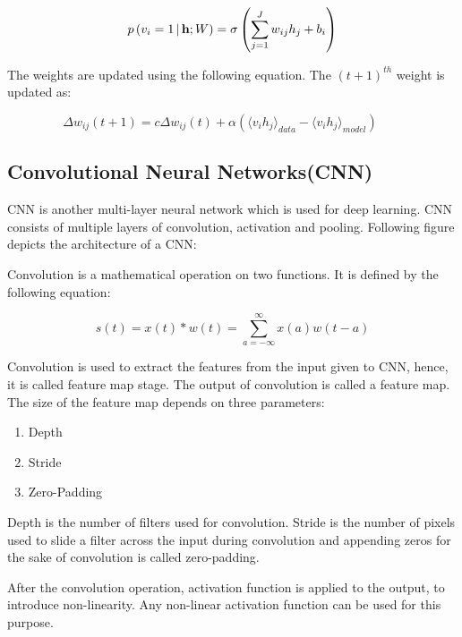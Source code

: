 \documentclass[sigconf]{acmart}
\begin{document}
\begin{equation} p\left ( {v_{i}=1}\thinspace \vert \thinspace {\mathbf {h};W}\right ) =\sigma \left ( \sum \limits _{j=1}^J {w_{ij}h_{j}+b_{i}} \right )\end{equation}

The weights are updated using the following equation. The $(t+1)^{th}$ weight is updated as:

\begin{equation} \Delta w_{ij}\left ( t+1 \right )=c\Delta w_{ij}\left ( t \right )+\alpha \left (\langle v_i h_j \rangle _{data}-\langle v_i h_j \rangle _{model} \right )\qquad\end{equation}

\subsection{Convolutional Neural Networks(CNN)}
CNN is another multi-layer neural network which is used for deep learning. CNN consists of multiple layers of convolution, activation and pooling. Following figure depicts the architecture of a CNN:


Convolution is a mathematical operation on two functions. It is defined by the following equation:

\begin{equation}
    s(t) = x(t)*w(t) = \sum^{\infty}_{a = -\infty}x(a)w(t-a)
\end{equation}

Convolution is used to extract the features from the input given to CNN, hence, it is called feature map stage. The output of convolution is called a feature map. The size of the feature map depends on three parameters:
\begin{enumerate}
    \item Depth
    \item Stride
    \item Zero-Padding
\end{enumerate}

Depth is the number of filters used for convolution. Stride is the number of pixels used to slide a filter across the input during convolution and appending zeros for the sake of convolution is called zero-padding.

After the convolution operation, activation function is applied to the output, to introduce non-linearity. Any non-linear activation function can be used for this purpose. 
\end{document}
